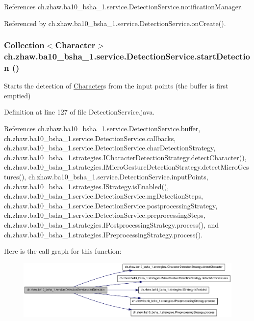 References ch.zhaw.ba10\_\-bsha\_\-1.service.DetectionService.notificationManager.

Referenced by ch.zhaw.ba10\_\-bsha\_\-1.service.DetectionService.onCreate().\hypertarget{classch_1_1zhaw_1_1ba10__bsha__1_1_1service_1_1DetectionService_a46d2b046ce0e9baa02ee1a064e7bd766}{
\subsubsection[{startDetection}]{\setlength{\rightskip}{0pt plus 5cm}Collection$<${\bf Character}$>$ ch.zhaw.ba10\_\-bsha\_\-1.service.DetectionService.startDetection ()}}
\label{classch_1_1zhaw_1_1ba10__bsha__1_1_1service_1_1DetectionService_a46d2b046ce0e9baa02ee1a064e7bd766}
Starts the detection of \hyperlink{classch_1_1zhaw_1_1ba10__bsha__1_1_1Character}{Character}s from the input points (the buffer is first emptied) 

Definition at line 127 of file DetectionService.java.

References ch.zhaw.ba10\_\-bsha\_\-1.service.DetectionService.buffer, ch.zhaw.ba10\_\-bsha\_\-1.service.DetectionService.callbacks, ch.zhaw.ba10\_\-bsha\_\-1.service.DetectionService.charDetectionStrategy, ch.zhaw.ba10\_\-bsha\_\-1.strategies.ICharacterDetectionStrategy.detectCharacter(), ch.zhaw.ba10\_\-bsha\_\-1.strategies.IMicroGestureDetectionStrategy.detectMicroGestures(), ch.zhaw.ba10\_\-bsha\_\-1.service.DetectionService.inputPoints, ch.zhaw.ba10\_\-bsha\_\-1.strategies.IStrategy.isEnabled(), ch.zhaw.ba10\_\-bsha\_\-1.service.DetectionService.mgDetectionSteps, ch.zhaw.ba10\_\-bsha\_\-1.service.DetectionService.postprocessingStrategy, ch.zhaw.ba10\_\-bsha\_\-1.service.DetectionService.preprocessingSteps, ch.zhaw.ba10\_\-bsha\_\-1.strategies.IPostprocessingStrategy.process(), and ch.zhaw.ba10\_\-bsha\_\-1.strategies.IPreprocessingStrategy.process().

Here is the call graph for this function:\nopagebreak
\begin{figure}[H]
\begin{center}
\leavevmode
\includegraphics[width=382pt]{classch_1_1zhaw_1_1ba10__bsha__1_1_1service_1_1DetectionService_a46d2b046ce0e9baa02ee1a064e7bd766_cgraph}
\end{center}
\end{figure}


